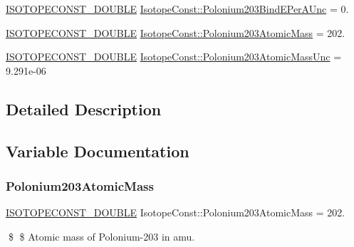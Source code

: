 \begin{DoxyCompactItemize}
\mbox{\hyperlink{group___isotope_const-_macros_ga8f45a7272ce02c0b4c65c44636ed719a}{I\+S\+O\+T\+O\+P\+E\+C\+O\+N\+S\+T\+\_\+\+D\+O\+U\+B\+LE}} \mbox{\hyperlink{group___isotope_const-_polonium-_po203_ga8baefc94482972092283a28123c3619e}{Isotope\+Const\+::\+Polonium203\+Bind\+E\+Per\+A\+Unc}} = 0.
\item 
\mbox{\hyperlink{group___isotope_const-_macros_ga8f45a7272ce02c0b4c65c44636ed719a}{I\+S\+O\+T\+O\+P\+E\+C\+O\+N\+S\+T\+\_\+\+D\+O\+U\+B\+LE}} \mbox{\hyperlink{group___isotope_const-_polonium-_po203_gaced71ae161eac4585bf28cdf0ddb220e}{Isotope\+Const\+::\+Polonium203\+Atomic\+Mass}} = 202.
\item 
\mbox{\hyperlink{group___isotope_const-_macros_ga8f45a7272ce02c0b4c65c44636ed719a}{I\+S\+O\+T\+O\+P\+E\+C\+O\+N\+S\+T\+\_\+\+D\+O\+U\+B\+LE}} \mbox{\hyperlink{group___isotope_const-_polonium-_po203_ga645e9a2c594d8b1f3899d0d48b17ac3d}{Isotope\+Const\+::\+Polonium203\+Atomic\+Mass\+Unc}} = 9.\+291e-\/06
\end{DoxyCompactItemize}


\subsection{Detailed Description}


\subsection{Variable Documentation}
\mbox{\label{group___isotope_const-_polonium-_po203_gaced71ae161eac4585bf28cdf0ddb220e}} 
\subsubsection{\texorpdfstring{Polonium203\+Atomic\+Mass}{Polonium203AtomicMass}}
{\footnotesize\ttfamily \mbox{\hyperlink{group___isotope_const-_macros_ga8f45a7272ce02c0b4c65c44636ed719a}{I\+S\+O\+T\+O\+P\+E\+C\+O\+N\+S\+T\+\_\+\+D\+O\+U\+B\+LE}} Isotope\+Const\+::\+Polonium203\+Atomic\+Mass = 202.}

\$ \$ Atomic mass of Polonium-\/203 in amu. \mbox{\label{group___isotope_const-_polonium-_po203_ga645e9a2c594d8b1f3899d0d48b17ac3d}} 
